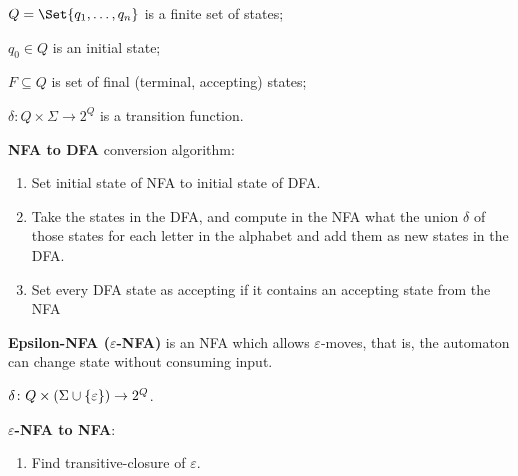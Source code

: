 \documentclass[a4paper,10pt]{article}
\begin{document}
\begin{terms}
\begin{terms}
        \item $Q = \Set{q_1, \dots, q_n}$ is a finite set of states;

        \item $q_0 \in Q$ is an initial state;

        \item $F \subseteq Q$ is set of final (terminal, accepting) states;

        \item $\delta: Q \times \Sigma \to 2^Q$ is a transition function.

    \end{terms}


    \item \textbf{NFA to DFA} conversion algorithm:

    \begin{enumerate}
        \item Set initial state of NFA to initial state of DFA.

        \item Take the states in the DFA, and compute in the NFA what the union $\delta$ of those states for each letter in the alphabet and add them as new states in the DFA.

        \item Set every DFA state as accepting if it contains an accepting state from the NFA
    \end{enumerate}

    \item \textbf{Epsilon-NFA ($\varepsilon$-NFA)} is an NFA which allows $\varepsilon$-moves, that is, the automaton can change state without consuming input.

    \begin{terms}
        \item $\delta \colon Q \times (\Sigma \cup \{\varepsilon\}) \to 2^Q$.
    \end{terms}

    \item \textbf{$\varepsilon$-NFA to NFA}:
    \begin{enumerate}
        \item Find transitive-closure of $\varepsilon$.


\end{enumerate}
\end{terms}
\end{document}
